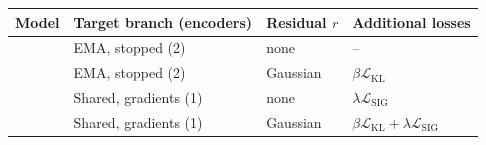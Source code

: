 \begin{tabular}{@{}llll@{}}
\toprule
Model & Target branch (encoders) & Residual $r$ & Additional losses \\
\midrule
\emadet{} & EMA, stopped (2) & none & -- \\
\emavar{} & EMA, stopped (2) & Gaussian & $\beta\mathcal{L}_{\mathrm{KL}}$ \\
\shdet{} & Shared, gradients (1) & none & $\lambda\mathcal{L}_{\mathrm{SIG}}$ \\
\shvar{} & Shared, gradients (1) & Gaussian & $\beta\mathcal{L}_{\mathrm{KL}}+\lambda\mathcal{L}_{\mathrm{SIG}}$ \\
\bottomrule
\end{tabular}
